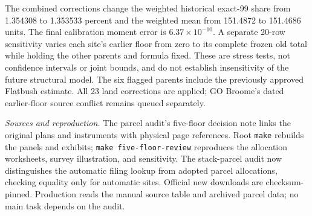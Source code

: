 The combined corrections change the weighted historical exact-99 share from
1.354308 to 1.353533 percent and the weighted mean from 151.4872 to 151.4686
units. The final calibration moment error is $6.37\times10^{-10}$. A separate
20-row sensitivity varies each site's earlier floor from zero to its complete
frozen old total while holding the other parents and formula fixed. These are
stress tests, not confidence intervals or joint bounds, and do not establish
insensitivity of the future structural model. The six flagged parents include
the previously approved Flatbush estimate. All 23 land corrections are applied;
GO Broome's dated earlier-floor source conflict remains queued separately.

\textit{Sources and reproduction.} The parcel audit's five-floor decision note
links the original plans and instruments with physical page references. Root
\texttt{make} rebuilds the panels and exhibits; \texttt{make five-floor-review}
reproduces the allocation worksheets, survey illustration, and sensitivity.
The stack-parcel audit now distinguishes the automatic filing lookup from
adopted parcel allocations, checking equality only for automatic sites.
Official new downloads are checksum-pinned. Production reads the manual source
table and archived parcel data; no main task depends on the audit.
